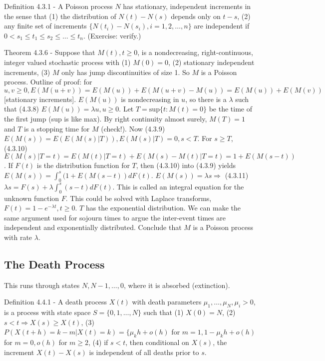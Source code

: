 \documentclass{article}
\begin{document}
Definition 4.3.1 - A Poisson process $N$ has stationary, independent increments in the sense that (1) the distribution of $N(t) - N(s)$ depends only on $t-s$, (2) any finite set of increments $\{N(t_i) - N(s_i), i = 1, 2, \dots, n\}$ are independent if $0 < s_1 \le t_1 \le s_2 \le \dots \le t_n$. (Exercise: verify.)

Theorem 4.3.6 - Suppose that $M(t), t \ge 0$, is a nondecreasing, right-continuous, integer valued stochastic process with (1) $M(0) = 0$, (2) stationary independent increments, (3) $M$ only has jump discontinuities of size 1. So $M$ is a Poisson process. Outline of proof: for $u, v \ge 0, E(M(u+v)) = E(M(u)) + E(M(u+v) - M(u)) = E(M(u)) + E(M(v))$ [stationary increments]. $E(M(u))$ is nondecreasing in $u$, so there is a $\lambda$ such that (4.3.8) $E(M(u)) = \lambda u, u \ge 0$. Let $T = \mathrm{sup}\{t: M(t)=0\}$ be the time of the first jump (sup is like max). By right continuity almost surely, $M(T) = 1$ and $T$ is a stopping time for $M$ (check!). Now (4.3.9) $E(M(s)) = E(E(M(s)|T)), E(M(s)|T) = 0, s < T$. For $s \ge T$, (4.3.10) $E(M(s)|T=t) = E(M(t)|T=t) + E(M(s)- M(t)|T=t) = 1 + E(M(s-t))$. If $F(t)$ is the distribution function for $T$, then (4.3.10) into (4.3.9) yields $E(M(s)) = \int_0^s (1+E(M(s-t)) d F(t)$. $E(M(s)) = \lambda s \Rightarrow$ (4.3.11) $\lambda s = F(s) + \lambda \int_0^s (s-t) d F(t)$. This is called an integral equation for the unknown function $F$. This could be solved with Laplace transforms, $F(t) = 1 - e^{-\lambda t}, t \ge 0$. $T$ has the exponential distribution. We can make the same argument used for sojourn times to argue the inter-event times are independent and exponentially distributed. Conclude that $M$ is a Poisson process with rate $\lambda$.

\subsection{The Death Process}

This runs through states $N, N-1, \dots, 0$, where it is absorbed (extinction).

Definition 4.4.1 - A death process $X(t)$ with death parameters $\mu_1, \dots, \mu_N, \mu_i > 0$, is a process with state space $S=\{0, 1, \dots, N\}$ such that (1) $X(0) = N$, (2) $s < t \Rightarrow X(s) \ge X(t)$, (3) $P(X(t+h) = k-m|X(t)=k) = \{\mu_k h + o(h)$ for $m = 1, 1 - \mu_k h + o(h)$ for $m = 0, o(h)$ for $m \ge 2$, (4) if $s < t$, then conditional on $X(s)$, the increment $X(t) - X(s)$ is independent of all deaths prior to $s$.
\end{document}

